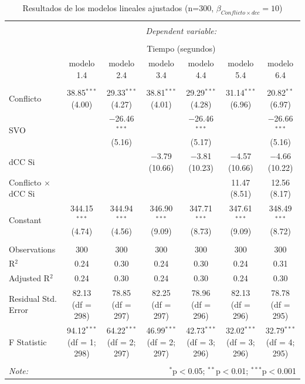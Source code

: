 \documentclass[
  spanish,
  10pt,
]{article}
\begin{document}
\begin{table}[H] \centering 
  \caption{Resultados de los modelos lineales ajustados (n=300, $\beta_{Conflicto \times dcc} = 10$)} 
  \label{} 
\tiny 
\begin{tabular}{@{\extracolsep{5pt}}lcccccc} 
\\[-1.8ex]\hline 
\hline \\[-1.8ex] 
 & \multicolumn{6}{c}{\textit{Dependent variable:}} \\ 
\cline{2-7} 
\\[-1.8ex] & \multicolumn{6}{c}{Tiempo (segundos)} \\ 
 & modelo 1.4 & modelo 2.4 & modelo 3.4 & modelo 4.4 & modelo 5.4 & modelo 6.4 \\ 
\hline \\[-1.8ex] 
 Conflicto & 38.85$^{***}$ (4.00) & 29.33$^{***}$ (4.27) & 38.81$^{***}$ (4.01) & 29.29$^{***}$ (4.28) & 31.14$^{***}$ (6.96) & 20.82$^{**}$ (6.97) \\ 
  SVO &  & $-$26.46$^{***}$ (5.16) &  & $-$26.46$^{***}$ (5.17) &  & $-$26.66$^{***}$ (5.16) \\ 
  dCC Si &  &  & $-$3.79 (10.66) & $-$3.81 (10.23) & $-$4.57 (10.66) & $-$4.66 (10.22) \\ 
  Conflicto $\times$ dCC Si &  &  &  &  & 11.47 (8.51) & 12.56 (8.17) \\ 
  Constant & 344.15$^{***}$ (4.74) & 344.94$^{***}$ (4.56) & 346.90$^{***}$ (9.09) & 347.71$^{***}$ (8.73) & 347.61$^{***}$ (9.09) & 348.49$^{***}$ (8.72) \\ 
 \hline \\[-1.8ex] 
Observations & 300 & 300 & 300 & 300 & 300 & 300 \\ 
R$^{2}$ & 0.24 & 0.30 & 0.24 & 0.30 & 0.24 & 0.31 \\ 
Adjusted R$^{2}$ & 0.24 & 0.30 & 0.24 & 0.30 & 0.24 & 0.30 \\ 
Residual Std. Error & 82.13 (df = 298) & 78.85 (df = 297) & 82.25 (df = 297) & 78.96 (df = 296) & 82.13 (df = 296) & 78.78 (df = 295) \\ 
F Statistic & 94.12$^{***}$ (df = 1; 298) & 64.22$^{***}$ (df = 2; 297) & 46.99$^{***}$ (df = 2; 297) & 42.73$^{***}$ (df = 3; 296) & 32.02$^{***}$ (df = 3; 296) & 32.79$^{***}$ (df = 4; 295) \\ 
\hline 
\hline \\[-1.8ex] 
\textit{Note:}  & \multicolumn{6}{r}{$^{*}$p$<$0.05; $^{**}$p$<$0.01; $^{***}$p$<$0.001} \\ 
\end{tabular} 
\end{table}
\end{document}
